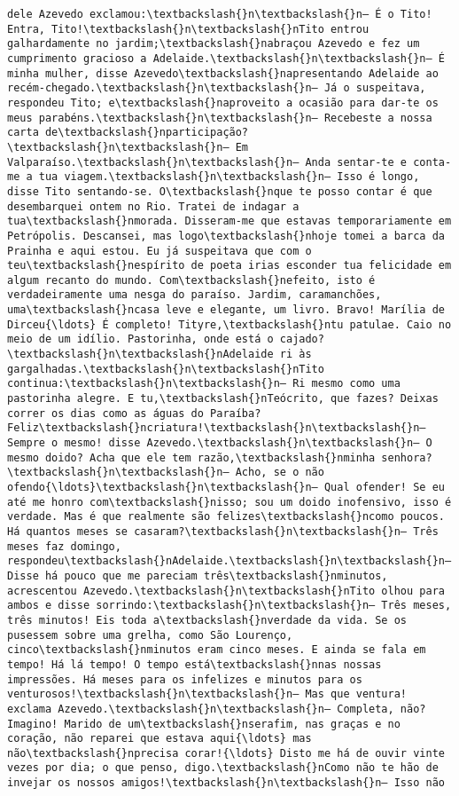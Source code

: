 \documentclass[11pt]{article}
\begin{document}
\begin{Verbatim}[commandchars=\\\{\}]
dele Azevedo exclamou:\textbackslash{}n\textbackslash{}n— É o Tito! Entra, Tito!\textbackslash{}n\textbackslash{}nTito entrou galhardamente no jardim;\textbackslash{}nabraçou Azevedo e fez um cumprimento gracioso a Adelaide.\textbackslash{}n\textbackslash{}n— É minha mulher, disse Azevedo\textbackslash{}napresentando Adelaide ao recém-chegado.\textbackslash{}n\textbackslash{}n— Já o suspeitava, respondeu Tito; e\textbackslash{}naproveito a ocasião para dar-te os meus parabéns.\textbackslash{}n\textbackslash{}n— Recebeste a nossa carta de\textbackslash{}nparticipação?\textbackslash{}n\textbackslash{}n— Em Valparaíso.\textbackslash{}n\textbackslash{}n— Anda sentar-te e conta-me a tua viagem.\textbackslash{}n\textbackslash{}n— Isso é longo, disse Tito sentando-se. O\textbackslash{}nque te posso contar é que desembarquei ontem no Rio. Tratei de indagar a tua\textbackslash{}nmorada. Disseram-me que estavas temporariamente em Petrópolis. Descansei, mas logo\textbackslash{}nhoje tomei a barca da Prainha e aqui estou. Eu já suspeitava que com o teu\textbackslash{}nespírito de poeta irias esconder tua felicidade em algum recanto do mundo. Com\textbackslash{}nefeito, isto é verdadeiramente uma nesga do paraíso. Jardim, caramanchões, uma\textbackslash{}ncasa leve e elegante, um livro. Bravo! Marília de Dirceu{\ldots} É completo! Tityre,\textbackslash{}ntu patulae. Caio no meio de um idílio. Pastorinha, onde está o cajado?\textbackslash{}n\textbackslash{}nAdelaide ri às gargalhadas.\textbackslash{}n\textbackslash{}nTito continua:\textbackslash{}n\textbackslash{}n— Ri mesmo como uma pastorinha alegre. E tu,\textbackslash{}nTeócrito, que fazes? Deixas correr os dias como as águas do Paraíba? Feliz\textbackslash{}ncriatura!\textbackslash{}n\textbackslash{}n— Sempre o mesmo! disse Azevedo.\textbackslash{}n\textbackslash{}n— O mesmo doido? Acha que ele tem razão,\textbackslash{}nminha senhora?\textbackslash{}n\textbackslash{}n— Acho, se o não ofendo{\ldots}\textbackslash{}n\textbackslash{}n— Qual ofender! Se eu até me honro com\textbackslash{}nisso; sou um doido inofensivo, isso é verdade. Mas é que realmente são felizes\textbackslash{}ncomo poucos. Há quantos meses se casaram?\textbackslash{}n\textbackslash{}n— Três meses faz domingo, respondeu\textbackslash{}nAdelaide.\textbackslash{}n\textbackslash{}n— Disse há pouco que me pareciam três\textbackslash{}nminutos, acrescentou Azevedo.\textbackslash{}n\textbackslash{}nTito olhou para ambos e disse sorrindo:\textbackslash{}n\textbackslash{}n— Três meses, três minutos! Eis toda a\textbackslash{}nverdade da vida. Se os pusessem sobre uma grelha, como São Lourenço, cinco\textbackslash{}nminutos eram cinco meses. E ainda se fala em tempo! Há lá tempo! O tempo está\textbackslash{}nnas nossas impressões. Há meses para os infelizes e minutos para os venturosos!\textbackslash{}n\textbackslash{}n— Mas que ventura! exclama Azevedo.\textbackslash{}n\textbackslash{}n— Completa, não? Imagino! Marido de um\textbackslash{}nserafim, nas graças e no coração, não reparei que estava aqui{\ldots} mas não\textbackslash{}nprecisa corar!{\ldots} Disto me há de ouvir vinte vezes por dia; o que penso, digo.\textbackslash{}nComo não te hão de invejar os nossos amigos!\textbackslash{}n\textbackslash{}n— Isso não 
\end{Verbatim}
\end{document}
